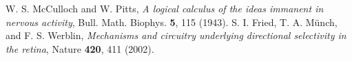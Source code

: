  W. S. McCulloch and W. Pitts, \emph{A logical calculus of the ideas immanent in nervous activity}, Bull. Math. Biophys. \textbf{5}, 115 (1943).
 S. I. Fried, T. A. M\"unch, and F. S. Werblin, \emph{Mechanisms and circuitry underlying directional selectivity in the retina}, Nature \textbf{420}, 411 (2002).
